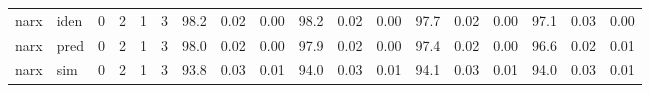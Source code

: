 \begin{landscape}
\begin{center}
\begin{longtable}{ll|cccc|ccc|ccc|ccc|ccc}
 \hline 
narx & iden & 0 & 2 & 1 & 3 & 98.2 & 0.02 & 0.00 & 98.2 & 0.02 & 0.00 & 97.7 & 0.02 & 0.00 & 97.1 & 0.03 & 0.00 \\ 
narx & pred & 0 & 2 & 1 & 3 & 98.0 & 0.02 & 0.00 & 97.9 & 0.02 & 0.00 & 97.4 & 0.02 & 0.00 & 96.6 & 0.02 & 0.01 \\ 
narx & sim  & 0 & 2 & 1 & 3 & 93.8 & 0.03 & 0.01 & 94.0 & 0.03 & 0.01 & 94.1 & 0.03 & 0.01 & 94.0 & 0.03 & 0.01 \\ 
 \hline 
\end{longtable} 
\normalsize \end{center} 
 \end{landscape}